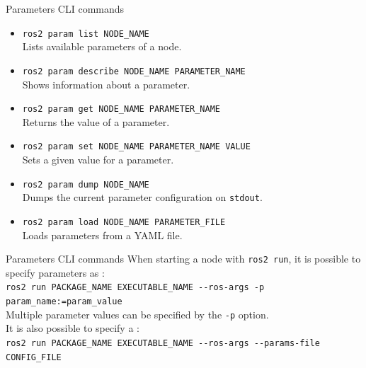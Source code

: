 \begin{frame}{Parameters CLI commands}
  \justifying
	\begin{itemize}
		\item \texttt{ros2 param list NODE\_NAME}\\Lists available parameters of a node.
		\item \texttt{ros2 param describe NODE\_NAME PARAMETER\_NAME}\\Shows information about a parameter.
		\item \texttt{ros2 param get NODE\_NAME PARAMETER\_NAME}\\Returns the value of a parameter.
		\item \texttt{ros2 param set NODE\_NAME PARAMETER\_NAME VALUE}\\Sets a given value for a parameter.
		\item \texttt{ros2 param dump NODE\_NAME}\\Dumps the current parameter configuration on \texttt{stdout}.
		\item \texttt{ros2 param load NODE\_NAME PARAMETER\_FILE}\\Loads parameters from a YAML file.
	\end{itemize}
\end{frame}
\begin{frame}{Parameters CLI commands}
  When starting a node with \texttt{ros2 run}, it is possible to specify parameters as :\\
  \bigskip
  \texttt{ros2 run PACKAGE\_NAME EXECUTABLE\_NAME -{}-ros-args -p param\_name:=param\_value}\\
  \bigskip
  Multiple parameter values can be specified by  the \texttt{-p} option.\\
  It is also possible to specify a :\\
  \bigskip
  \texttt{ros2 run PACKAGE\_NAME EXECUTABLE\_NAME -{}-ros-args -{}-params-file CONFIG\_FILE}
\end{frame}

